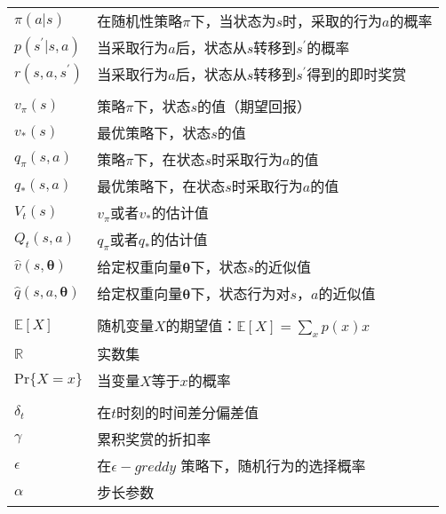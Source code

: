 \begin{longtable}{p{2cm}p{11cm}}
$\pi(a|s)$      & 在随机性策略$\pi$下，当状态为$s$时，采取的行为$a$的概率                 \\
$p(s^{'}|s,a)$      & 当采取行为$a$后，状态从$s$转移到$s^{'}$的概率  \\
$r(s,a,s^{'})$      &   当采取行为$a$后，状态从$s$转移到$s^{'}$得到的即时奖赏\\
                            &                                         \\
$v_{\pi}(s)$     & 策略$\pi$下，状态$s$的值（期望回报）             \\
$v_{*}(s)$     & 最优策略下，状态$s$的值    \\
$q_{\pi}(s,a)$     & 策略$\pi$下，在状态$s$时采取行为$a$的值             \\
$q_{*}(s,a)$     & 最优策略下，在状态$s$时采取行为$a$的值    \\
$V_{t}(s)$     & $v_{\pi}$或者$v_{*}$的估计值             \\
$Q_{t}(s,a)$     & $q_{\pi}$或者$q_{*}$的估计值    \\
$\hat{v}(s,\bm{\theta})$     & 给定权重向量$\bm{\theta}$下，状态$s$的近似值         \\
$\hat{q}(s,a,\bm{\theta})$     & 给定权重向量$\bm{\theta}$下，状态行为对$s$，$a$的近似值     \\
                            &                                         \\

$\mathbb{E}[X]$     & 随机变量$X$的期望值：$\mathbb{E}[X]=\sum_{x}p(x)x$    \\                      
$\mathbb{R}$     & 实数集    \\
$\text{Pr}\{X=x\}$     & 当变量$X$等于$x$的概率    \\
                            &                        \\
$\delta_{t}$     & 在$t$时刻的时间差分偏差值    \\
$\gamma$     & 累积奖赏的折扣率    \\
$\epsilon$     & 在$\epsilon-greddy$ 策略下，随机行为的选择概率         \\
$\alpha$     & 步长参数  \\

\end{longtable}


